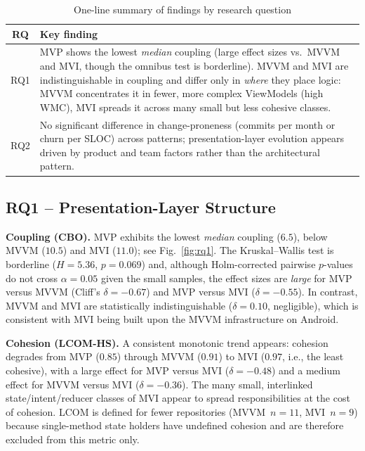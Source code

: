\documentclass[conference]{IEEEtran}
\begin{document}
\begin{table}[!t]
\centering
\caption{One-line summary of findings by research question}
\label{tab:summary}
\begin{tabular}{|c|p{6.7cm}|}
\hline
\textbf{RQ} & \textbf{Key finding} \\ \hline
RQ1 & MVP shows the lowest \emph{median} coupling (large effect sizes vs.\ MVVM
and MVI, though the omnibus test is borderline). MVVM and MVI are indistinguishable
in coupling and differ only in \emph{where} they place logic: MVVM concentrates it
in fewer, more complex ViewModels (high WMC), MVI spreads it across many small but
less cohesive classes. \\ \hline
RQ2 & No significant difference in change-proneness (commits per month or churn per
SLOC) across patterns; presentation-layer evolution appears driven by product and
team factors rather than the architectural pattern. \\ \hline
\end{tabular}
\end{table}



\subsection{RQ1 -- Presentation-Layer Structure}

\textbf{Coupling (CBO).} MVP exhibits the lowest \emph{median} coupling ($6.5$),
below MVVM ($10.5$) and MVI ($11.0$); see Fig.~\ref{fig:rq1}. The Kruskal--Wallis
test is borderline ($H=5.36$, $p=0.069$) and, although Holm-corrected pairwise
$p$-values do not cross $\alpha=0.05$ given the small samples, the effect sizes are
\emph{large} for MVP versus MVVM (Cliff's $\delta=-0.67$) and MVP versus MVI
($\delta=-0.55$). In contrast, MVVM and MVI are statistically indistinguishable
($\delta=0.10$, negligible), which is consistent with MVI being built upon the
MVVM infrastructure on Android.

\textbf{Cohesion (LCOM-HS).} A consistent monotonic trend appears: cohesion
degrades from MVP ($0.85$) through MVVM ($0.91$) to MVI ($0.97$, i.e., the least
cohesive), with a large effect for MVP versus MVI ($\delta=-0.48$) and a medium
effect for MVVM versus MVI ($\delta=-0.36$). The many small, interlinked
state/intent/reducer classes of MVI appear to spread responsibilities at the cost
of cohesion. LCOM is defined for fewer repositories (MVVM~$n=11$, MVI~$n=9$)
because single-method state holders have undefined cohesion and are therefore
excluded from this metric only.
\end{document}
